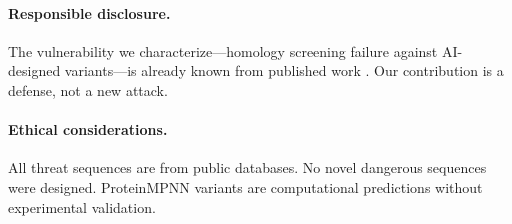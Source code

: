 \documentclass[11pt,a4paper]{article}
\begin{document}
\paragraph{Responsible disclosure.}
The vulnerability we characterize---homology screening failure against AI-designed variants---is already known from published work \cite{horvitz2025strengthening}. Our contribution is a defense, not a new attack.

\paragraph{Ethical considerations.}
All threat sequences are from public databases. No novel dangerous sequences were designed. ProteinMPNN variants are computational predictions without experimental validation.
\end{document}
